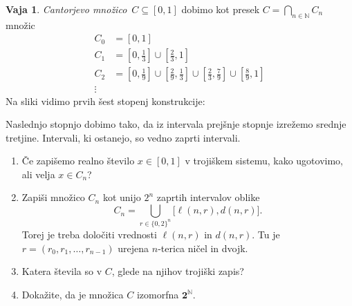 \documentclass{article}
\newcommand{\two}{\mathbf{2}}
\newcommand{\NN}{\mathbb{N}}
\theoremstyle{definition}
\newtheorem{vaja}{Vaja}
\begin{document}
\begin{vaja}
  \emph{Cantorjevo množico}~$C \subseteq [0,1]$ dobimo kot presek $C = \bigcap_{n \in \NN} C_n$
  množic
  \begin{align*}
    C_0 &= \textstyle
          [0,1] \\
    C_1 &= \textstyle
          [0,\frac{1}{3}] \cup [\frac{2}{3}, 1] \\
    C_2 &= \textstyle
          [0,\frac{1}{9}] \cup [\frac{2}{9}, \frac{1}{3}] \cup
          [\frac{2}{3},\frac{7}{9}] \cup [\frac{8}{9}, 1] \\
    \vdots &
  \end{align*}
  Na sliki vidimo prvih šest stopenj konstrukcije:
  \begin{center}
  \end{center}
  Naslednjo stopnjo dobimo tako, da iz intervala prejšnje stopnje izrežemo srednje
  tretjine. Intervali, ki ostanejo, so vedno zaprti intervali.
  \begin{enumerate}
  \item Če zapišemo realno število $x \in [0,1]$ v trojiškem sistemu, kako ugotovimo, ali
    velja $x \in C_n$?

  \item Zapiši množico $C_n$ kot unijo $2^n$ zaprtih intervalov oblike
    \begin{equation*}
      C_n = \bigcup_{r \in \{0,2\}^n} \big[\ell(n, r), d(n, r)\big].
    \end{equation*}
    Torej je treba določiti vrednosti $\ell(n, r)$ in $d(n, r)$. Tu je
    $r = (r_0, r_1, \ldots, r_{n-1})$ urejena $n$-terica ničel in dvojk.

  \item Katera števila so v $C$, glede na njihov trojiški zapis?

  \item Dokažite, da je množica $C$ izomorfna $\two^\NN$.
  \end{enumerate}
\end{vaja}
\end{document}
